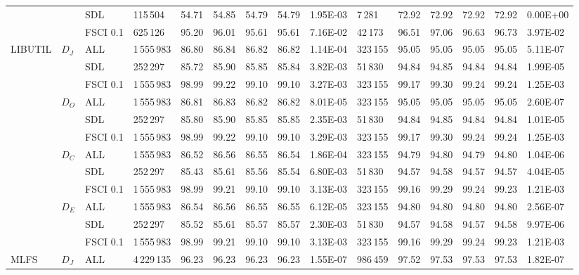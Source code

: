 \begin{table*}[h]
\begin{tabular}{|lllllllllllllll|}
 & & SDL & 115\,504 & 54.71  & 54.85  & 54.79 & 54.79   & 1.95E-03 & 7\,281   & 72.92  & 72.92  & 72.92 & 72.92   & 0.00E+00    \\
 & & FSCI 0.1   & 625\,126  & 95.20  & 96.01  & 95.61 & 95.61   & 7.16E-02  & 42\,173  & 96.51  & 97.06  & 96.63 & 96.73   & 3.97E-02    \\
\hline
\multirow{12}{*}{LIBUTIL}  & \multirow{3}{*}{$D_J$}   & ALL& 1\,555\,983 & 86.80  & 86.84  & 86.82 & 86.82   & 1.14E-04  &323\,155  & 95.05  & 95.05  & 95.05 & 95.05   & 5.11E-07    \\
 & & SDL& 252\,297  & 85.72  & 85.90  & 85.85 & 85.84   & 3.82E-03  & 51\,830 & 94.84  & 94.85  & 94.84 & 94.84   & 1.99E-05    \\
 & & FSCI 0.1  & 1\,555\,983  & 98.99  & 99.22  & 99.10 & 99.10   & 3.27E-03  &323\,155  & 99.17  & 99.30  & 99.24 & 99.24   & 1.25E-03    \\
 & \multirow{3}{*}{$D_O$}    & ALL& 1\,555\,983 & 86.81  & 86.83  & 86.82 & 86.82   & 8.01E-05   &323\,155 & 95.05  & 95.05  & 95.05 & 95.05   & 2.60E-07    \\
 & & SDL & 252\,297 & 85.80  & 85.90  & 85.85 & 85.85   & 2.35E-03 & 51\,830  & 94.84  & 94.85  & 94.84 & 94.84   & 1.01E-05    \\
 & & FSCI 0.1  & 1\,555\,983  & 98.99  & 99.22  & 99.10 & 99.10   & 3.29E-03  &323\,155  & 99.17  & 99.30  & 99.24 & 99.24   & 1.25E-03    \\
 & \multirow{3}{*}{$D_C$}    & ALL& 1\,555\,983 & 86.52  & 86.56  & 86.55 & 86.54   & 1.86E-04  &323\,155  & 94.79  & 94.80  & 94.79 & 94.80   & 1.04E-06    \\
 & & SDL & 252\,297 & 85.43  & 85.61  & 85.56 & 85.54   & 6.80E-03  & 51\,830 & 94.57  & 94.58  & 94.57 & 94.57   & 4.04E-05    \\
 & & FSCI 0.1   & 1\,555\,983 & 98.99  & 99.21  & 99.10 & 99.10   & 3.13E-03  &323\,155  & 99.16  & 99.29  & 99.24 & 99.23   & 1.21E-03    \\
 & \multirow{3}{*}{$D_E$} & ALL& 1\,555\,983 & 86.54  & 86.56  & 86.55 & 86.55   & 6.12E-05  &323\,155  & 94.80  & 94.80  & 94.80 & 94.80   & 2.56E-07    \\
 & & SDL & 252\,297 & 85.52  & 85.61  & 85.57 & 85.57   & 2.30E-03 & 51\,830  & 94.57  & 94.58  & 94.57 & 94.58   & 9.97E-06    \\
 & & FSCI 0.1   & 1\,555\,983 & 98.99  & 99.21  & 99.10 & 99.10   & 3.13E-03  &323\,155  & 99.16  & 99.29  & 99.24 & 99.23   & 1.21E-03    \\
\hline
\multirow{12}{*}{MLFS} & \multirow{3}{*}{$D_J$}   & ALL & 4\,229\,135& 96.23  & 96.23  & 96.23 & 96.23   & 1.55E-07 & 986\,459   & 97.52  & 97.53  & 97.53 & 97.53   & 1.82E-07    \\

\end{tabular}
\end{table*}
